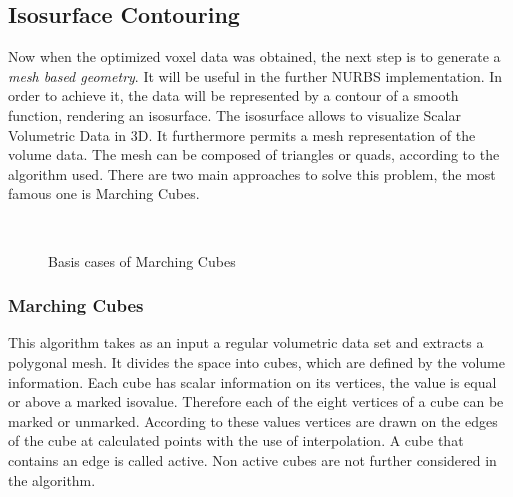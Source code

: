 \subsection{Isosurface Contouring}
Now when the optimized voxel data was obtained, the next step is to generate a \emph{mesh based
geometry}. It will be useful in the further NURBS implementation. In order to achieve it, the
data will be represented by a contour of a smooth function, rendering an isosurface. The
isosurface allows to visualize Scalar Volumetric Data in 3D. It furthermore permits a mesh
representation of the volume data. The mesh can be composed of triangles or quads, according
to the algorithm used. There are two main approaches to solve this problem, the most
famous one is Marching Cubes.

\begin{figure}
\centering
   \\
   \caption{Basis cases of Marching Cubes}
\end{figure}

\subsubsection{Marching Cubes} 

This algorithm takes as an input a regular volumetric data set and extracts a polygonal mesh. It
divides the space into cubes, which are defined by the volume information. Each cube has scalar
information on its vertices, the value is equal or above a marked isovalue. Therefore each of the
eight vertices of a cube can be marked or unmarked. According to these values vertices are drawn
on the edges of the cube at calculated points with the use of interpolation. A cube that contains
an edge is called active. Non active cubes are not further considered in the algorithm.

